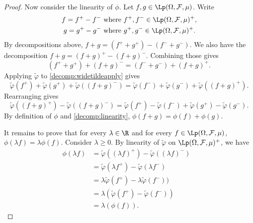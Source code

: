 \begin{proof}
Now consider the linearity of $\phi$. Let $f, g \in \Lp(\Omega, \mathcal{F}, \mu)$. Write
\begin{align*}
    f = f^+ - f^- & \text{ where } f^+, f^- \in \Lp(\Omega, \mathcal{F}, \mu)^+, \\
    g = g^+ - g^- & \text{ where } g^+, g^- \in \Lp(\Omega, \mathcal{F}, \mu)^+.
\end{align*}
By decompositions above, $f + g = (f^+ + g^+) - (f^- + g^-)$.
We also have the decomposition $f + g = (f+g)^+ - (f+g)^-$. Combining those gives
\begin{equation}
    \label{decomp:widetildeapply}
    (f^+ + g^+) + (f+g)^- = (f^- + g^-) + (f+g)^+.
\end{equation}
Applying $\widetilde{\varphi}$ to \ref{decomp:widetildeapply} gives 
\begin{equation*}
   \widetilde{\varphi}(f^+) + \widetilde{\varphi}(g^+) + \widetilde{\varphi}((f+g)^-) = \widetilde{\varphi}(f^-) + \widetilde{\varphi}(g^-) + \widetilde{\varphi}((f+g)^+).
\end{equation*}
Rearranging gives
\begin{equation}
\label{decomp:linearity}
\widetilde{\varphi}((f+g)^+) - \widetilde{\varphi}((f+g)^-) =  \widetilde{\varphi}(f^+) - \widetilde{\varphi}(f^-) + \widetilde{\varphi}(g^+) -  \widetilde{\varphi}(g^-).
\end{equation}
By definition of $\phi$ and \ref{decomp:linearity}, $\phi(f + g) = \phi(f) + \phi(g)$.

It remains to prove that for every $\lambda \in \R$ and for every $f \in \Lp(\Omega, \mathcal{F}, \mu)$, $\phi(\lambda f) = \lambda \phi (f)$.  Consider $\lambda \geq 0$. By linearity of $\widetilde{\varphi}$ on $\Lp(\Omega, \mathcal{F}, \mu)^+$, we have
\begin{align*}
    \phi (\lambda f) &= \widetilde{\varphi}((\lambda f)^+) - \widetilde{\varphi}((\lambda f)^-) & \\
                     &= \widetilde{\varphi}(\lambda f^+) - \widetilde{\varphi}(\lambda f^-) & \\
                     &= \lambda \widetilde{\varphi}(f^+) - \lambda \widetilde{\varphi}(f^-)) & \\
                     &= \lambda \left ( \widetilde{\varphi}(f^+) - \widetilde{\varphi}(f^-) \right ) & \\
                     &= \lambda \left ( \phi(f) \right ).
\end{align*}


\end{proof}
